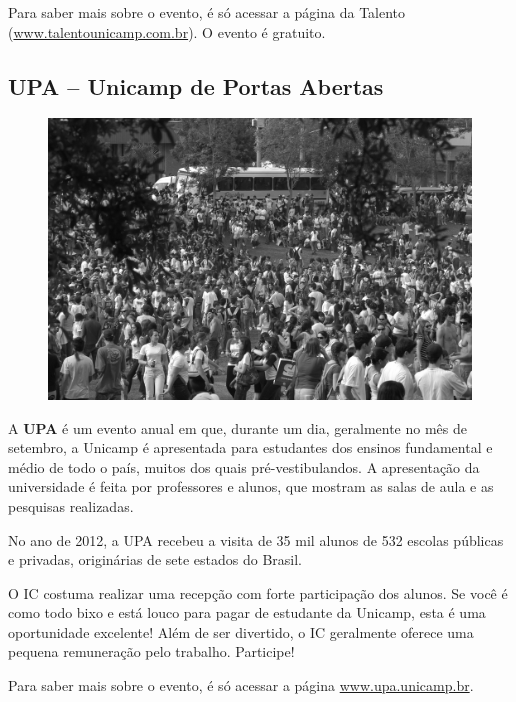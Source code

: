 Para saber mais sobre o evento, é só acessar a página da Talento
(\url{www.talentounicamp.com.br}). O evento é gratuito.

\subsection{UPA -- Unicamp de Portas Abertas}

\begin{figure}[h!]
    \centering
    \includegraphics[scale=0.38, keepaspectratio=true]{img/imgs/bateria.jpg}
\end{figure}

A \textbf{UPA} é um evento anual em que, durante um dia, geralmente no mês
de setembro, a Unicamp é apresentada para estudantes dos ensinos fundamental
e médio de todo o país, muitos dos quais pré-vestibulandos. A apresentação
da universidade é feita por professores e alunos, que mostram as salas de aula
e as pesquisas realizadas.

No ano de 2012, a UPA recebeu a visita de 35 mil alunos de 532 escolas públicas
e privadas, originárias de sete estados do Brasil.

O IC costuma realizar uma recepção com forte participação dos alunos. Se você
é como todo bixo e está louco para pagar de estudante da Unicamp, esta é uma
oportunidade excelente! Além de ser divertido, o IC geralmente oferece uma
pequena remuneração pelo trabalho. Participe!

Para saber mais sobre o evento, é só acessar a página \url{www.upa.unicamp.br}.